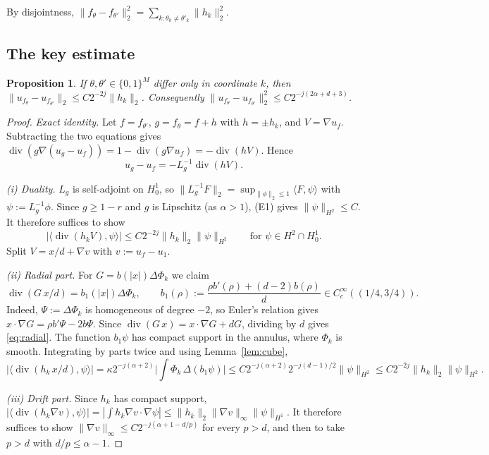 \documentclass[11pt]{article}
\newtheorem{proposition}[theorem]{Proposition}
\theoremstyle{definition}
\theoremstyle{remark}
\newcommand{\dv}{\operatorname{div}}
\begin{document}
By disjointness, $\|f_\theta-f_{\theta'}\|_2^2=\sum_{k:\theta_k\ne\theta'_k}\|h_k\|_2^2$.

\subsection{The key estimate}

\begin{proposition}\label{prop:key}
If $\theta,\theta'\in\{0,1\}^M$ differ only in coordinate $k$, then $\|u_{f_\theta}-u_{f_{\theta'}}\|_2\le C2^{-2j}\|h_k\|_2$. Consequently
$\|u_{f_\theta}-u_{f_{\theta'}}\|_2^2\le C2^{-j(2\alpha+d+3)}$.
\end{proposition}

\begin{proof}
\emph{Exact identity.} Let $f=f_{\theta'}$, $g=f_\theta=f+h$ with $h=\pm h_k$, and $V=\nabla u_f$. Subtracting the two equations gives $\dv(g\nabla(u_g-u_f))=1-\dv(g\nabla u_f)=-\dv(hV)$. Hence
\[
u_g-u_f=-L_g^{-1}\dv(hV).
\]

\emph{(i) Duality.} $L_g$ is self-adjoint on $H^1_0$, so
$\|L_g^{-1}F\|_2=\sup_{\|\phi\|_2\le1}\langle F,\psi\rangle$ with $\psi:=L_g^{-1}\phi$.
Since $g\ge1-r$ and $g$ is Lipschitz (as $\alpha>1$), (E1) gives $\|\psi\|_{H^2}\le C$. It therefore suffices to show
\begin{equation}\label{eq:dual}
|\langle\dv(h_kV),\psi\rangle|\le C2^{-2j}\|h_k\|_2\|\psi\|_{H^2}\qquad\text{for }\psi\in H^2\cap H^1_0 .
\end{equation}
Split $V=x/d+\nabla v$ with $v:=u_f-u_1$.

\emph{(ii) Radial part.} For $G=b(|x|)\Delta\Phi_k$ we claim
\begin{equation}\label{eq:radial}
\dv(G\,x/d)=b_1(|x|)\Delta\Phi_k,\qquad b_1(\rho):=\frac{\rho b'(\rho)+(d-2)b(\rho)}{d}\in C^\infty_c((1/4,3/4)).
\end{equation}
Indeed, $\Psi:=\Delta\Phi_k$ is homogeneous of degree $-2$, so Euler's relation gives $x\cdot\nabla G=\rho b'\Psi-2b\Psi$. Since $\dv(G\,x)=x\cdot\nabla G+dG$, dividing by $d$ gives \eqref{eq:radial}. The function $b_1\psi$ has compact support in the annulus, where $\Phi_k$ is smooth. Integrating by parts twice and using Lemma~\ref{lem:cube},
\[
|\langle\dv(h_k\,x/d),\psi\rangle|=\kappa2^{-j(\alpha+2)}\Big|\int\Phi_k\,\Delta(b_1\psi)\Big|\le C2^{-j(\alpha+2)}2^{-j(d-1)/2}\|\psi\|_{H^2}\le C2^{-2j}\|h_k\|_2\|\psi\|_{H^2}.
\]

\emph{(iii) Drift part.} Since $h_k$ has compact support,
$|\langle\dv(h_k\nabla v),\psi\rangle|=|\int h_k\nabla v\cdot\nabla\psi|\le\|h_k\|_2\|\nabla v\|_\infty\|\psi\|_{H^1}$.
It therefore suffices to show $\|\nabla v\|_\infty\le C2^{-j(\alpha+1-d/p)}$ for every $p>d$, and then to take $p>d$ with $d/p\le\alpha-1$.


\end{proof}
\end{document}
